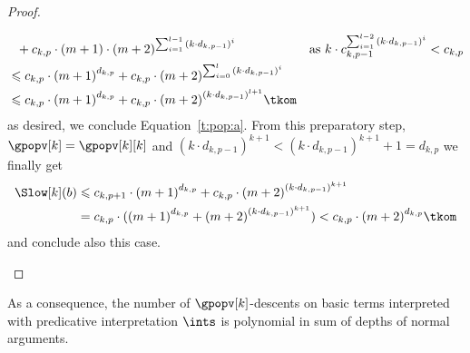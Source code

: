 \documentclass{LMCS}
\begin{document}
\begin{proof}
\begin{description}[leftmargin=0.3cm]
\begin{align*}
      & ~~ + c_{k,p} \cdot (m + 1) \cdot {(m+2)}^{\sum_{i=1}^{l-1} {(k \cdot d_{k,p-1})}^i}
      && \text{as $k \cdot c_{k,p-1}^{\sum_{i=1}^{l-2} {(k \cdot d_{k,p-1})}^i} < c_{k,p}$}\\
      & \leqslant c_{k,p} \cdot {(m+1)}^{d_{k,p}} + c_{k,p} \cdot {(m+2)}^{\sum_{i=0}^{l} {(k \cdot d_{k,p-1})}^i} \\
      & \leqslant c_{k,p} \cdot {(m+1)}^{d_{k,p}} + c_{k,p} \cdot {(m+2)}^{{(k \cdot d_{k,p-1})}^{l+1}} \tkom 
    \end{align*}
    as desired, we conclude Equation~\eqref{t:pop:a}.
From this preparatory step, ${\gpopv[k]} = {\gpopv[k][k]}$ 
    and ${(k \cdot d_{k,p-1})}^{k+1} < {(k \cdot d_{k,p-1})}^{k+1} + 1 = d_{k,p}$ we finally get
    \begin{align*}
      \Slow[k](b) & \leqslant c_{k,p+1}  \cdot {(m+1)}^{d_{k,p}} + c_{k,p} \cdot {(m + 2)}^{{(k \cdot d_{k,p-1})}^{k+1}} \\
      & = c_{k,p} \cdot ({(m+1)}^{d_{k,p}} + {(m + 2)}^{{(k \cdot d_{k,p-1})}^{k+1}}) 
      < c_{k,p} \cdot {(m + 2)}^{d_{k,p}}\tkom
    \end{align*}
    and conclude also this case.\qedhere
  \end{description}
\end{proof}


















\noindent As a consequence, the number of $\gpopv[k]$-descents on 
basic terms interpreted with predicative interpretation $\ints$ 
is polynomial in sum of depths of normal arguments.
\end{document}
